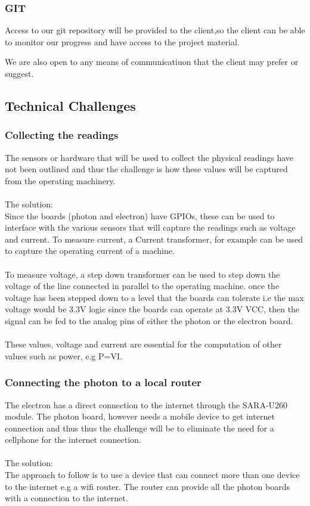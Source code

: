 \documentclass[a4paper,12pt]{article}
\begin{document}
\subsubsection{GIT}

Access to our git repository will be provided to the client,so the client can be able to monitor
our progress and have access to the project material.

We are also open to any means of communicatiuon that the client may prefer or suggest.

\subsection{Technical Challenges}
\subsubsection{Collecting the readings}
The sensors or hardware that will be used to collect the physical readings have not been outlined and thus the challenge is how these values will be captured from the operating machinery.\\ \\
The solution:\\ 
Since the boards (photon and electron) have GPIOs, these can be used to interface with the various sensors that will capture the readings such as voltage and current. To measure current, a Current transformer, for example can be used to capture the operating current of a machine.\\
\\
To measure voltage, a step down transformer can be used to step down the voltage of the line connected in parallel to the operating machine. once the voltage has been stepped down to a level that the boards can tolerate i.e the max voltage would be 3.3V logic since the boards can operate at 3.3V VCC, then the signal can be fed to the analog pins of either the photon or the electron board.
\\ \\
These values, voltage and current are essential for the computation of other values such as power, e.g P=VI. 

\subsubsection{Connecting the photon to a local router}
The electron has a direct connection to the internet through the SARA-U260 module. The photon board, however needs a mobile device to get internet connection and thus thus the challenge will be to eliminate the need for a cellphone for the internet connection.\\ \\
The solution:\\
The approach to follow is to use a device that can connect more than one device to the internet e.g a wifi router. The router can provide all the photon boards with a connection to the internet. 
\end{document}
